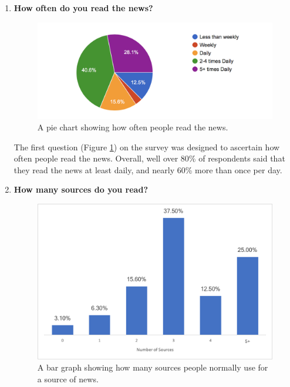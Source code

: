 \documentclass[12pt]{article}
\begin{document}
\begin{enumerate}

\item \textbf{How often do you read the news?}

\begin{figure}[ht!]
  \centering
    \includegraphics[scale=0.7]{01HowOftenDoYouReadTheNews}
   \caption[Survey Graph surrounding how often news is read]{A pie chart showing how often people read the news.}
   \label{SurveyHowOftenDoYouReadTheNews}
\end{figure}

The first question (Figure \ref{SurveyHowOftenDoYouReadTheNews}) on the survey was designed to ascertain how often people read the news. Overall, well over 80\% of respondents said that they read the news at least daily, and nearly 60\% more than once per day. \\

\item \textbf{How many sources do you read?}

\begin{figure}[ht!]
  \centering
    \includegraphics[scale=0.7]{02HowManySourcesDoYouRead}
   \caption[Survey Graph asking how many sources are used]{A bar graph showing how many sources people normally use for a source of news.}
   \label{SurveySources}
\end{figure}


\end{enumerate}
\end{document}
